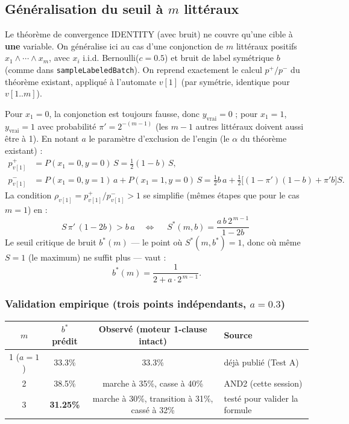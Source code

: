 \documentclass[12pt,a4paper]{article}
\theoremstyle{remark}
\newcommand{\Sstar}{S^{*}}
\begin{document}
\subsection{Généralisation du seuil à $m$ littéraux}

Le théorème de convergence IDENTITY (avec bruit) ne couvre qu'une cible à
\textbf{une} variable. On généralise ici au cas d'une conjonction de $m$
littéraux positifs $x_1 \wedge \cdots \wedge x_m$, avec $x_i$ i.i.d.
Bernoulli($c{=}0.5$) et bruit de label symétrique $b$ (comme dans
\texttt{sampleLabeledBatch}). On reprend exactement le calcul $p^+/p^-$ du
théorème existant, appliqué à l'automate $v[1]$ (par symétrie, identique
pour $v[1..m]$).

Pour $x_1=0$, la conjonction est toujours fausse, donc $y_{\text{vrai}}=0$ ;
pour $x_1=1$, $y_{\text{vrai}}=1$ avec probabilité $\pi' = 2^{-(m-1)}$ (les
$m-1$ autres littéraux doivent aussi être à 1). En notant $a$ le paramètre
d'exclusion de l'engin (le $\alpha$ du théorème existant) :
\begin{align*}
p^+_{v[1]} &= P(x_1{=}0, y{=}0)\,S = \tfrac12(1-b)\,S, \\
p^-_{v[1]} &= P(x_1{=}0, y{=}1)\,a + P(x_1{=}1, y{=}0)\,S
            = \tfrac12 b\,a + \tfrac12\bigl[(1-\pi')(1-b)+\pi' b\bigr]S.
\end{align*}
La condition $\rho_{v[1]} = p^+_{v[1]}/p^-_{v[1]} > 1$ se simplifie (mêmes
étapes que pour le cas $m=1$) en :
\[
  S\,\pi'\,(1-2b) > b\,a
  \quad\Longleftrightarrow\quad
  \boxed{\;\Sstar(m,b) = \dfrac{a\,b\,2^{\,m-1}}{1-2b}\;}
\]
Le seuil critique de bruit $b^*(m)$ --- le point où $\Sstar(m,b^*)=1$, donc
où même $S=1$ (le maximum) ne suffit plus --- vaut :
\[
  b^*(m) = \dfrac{1}{2 + a\cdot 2^{\,m-1}}.
\]

\subsubsection*{Validation empirique (trois points indépendants, $a=0.3$)}

\begin{center}
\begin{tabular}{@{}cccl@{}}
\toprule
$m$ & $b^*$ prédit & Observé (moteur 1-clause intact) & Source \\
\midrule
1 ($a=1$) & 33.3\% & 33.3\% & déjà publié (Test A) \\
2 & 38.5\% & marche à 35\%, casse à 40\% & AND2 (cette session) \\
3 & \textbf{31.25\%} & marche à 30\%, transition à 31\%, cassé à 32\% & testé pour valider la formule \\
\bottomrule
\end{tabular}
\end{center}
\end{document}
